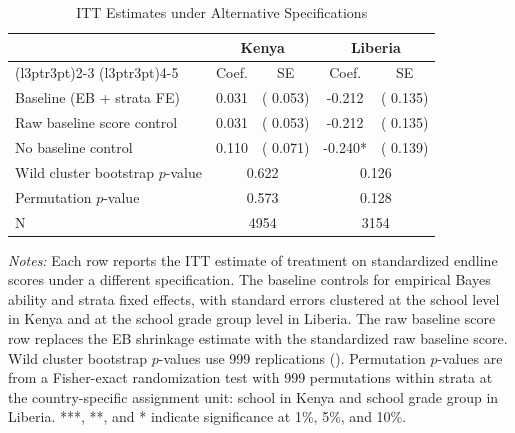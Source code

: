 \begin{table}[H]
\centering
\caption{ITT Estimates under Alternative Specifications}
\label{tab:spec_robust}
\begin{threeparttable}
\fontsize{9}{11}\selectfont
\begin{tabular}[t]{lcccc}
\toprule
 & \multicolumn{2}{c}{Kenya} & \multicolumn{2}{c}{Liberia} \\
\cmidrule(l{3pt}r{3pt}){2-3} \cmidrule(l{3pt}r{3pt}){4-5}
 & Coef. & SE & Coef. & SE \\
\midrule
Baseline (EB + strata FE) &   0.031 & (  0.053) &  -0.212 & (  0.135) \\
\addlinespace
Raw baseline score control &   0.031 & (  0.053) &  -0.212 & (  0.135) \\
\addlinespace
No baseline control &   0.110 & (  0.071) &  -0.240* & (  0.139) \\
\addlinespace
\midrule
Wild cluster bootstrap $p$-value & \multicolumn{2}{c}{0.622} & \multicolumn{2}{c}{0.126} \\
Permutation $p$-value & \multicolumn{2}{c}{0.573} & \multicolumn{2}{c}{0.128} \\
\addlinespace
N & \multicolumn{2}{c}{4954} & \multicolumn{2}{c}{3154} \\
\bottomrule
\end{tabular}
\begin{tablenotes}
\footnotesize
\item \textit{Notes:} Each row reports the ITT estimate of treatment on standardized endline scores under a different specification. The baseline controls for empirical Bayes ability and strata fixed effects, with standard errors clustered at the school level in Kenya and at the school grade group level in Liberia. The raw baseline score row replaces the EB shrinkage estimate with the standardized raw baseline score. Wild cluster bootstrap $p$-values use 999 replications (\citealt{cameron2008bootstrap}). Permutation $p$-values are from a Fisher-exact randomization test with 999 permutations within strata at the country-specific assignment unit: school in Kenya and school grade group in Liberia. ***, **, and * indicate significance at 1\%, 5\%, and 10\%.
\end{tablenotes}
\end{threeparttable}
\end{table}
